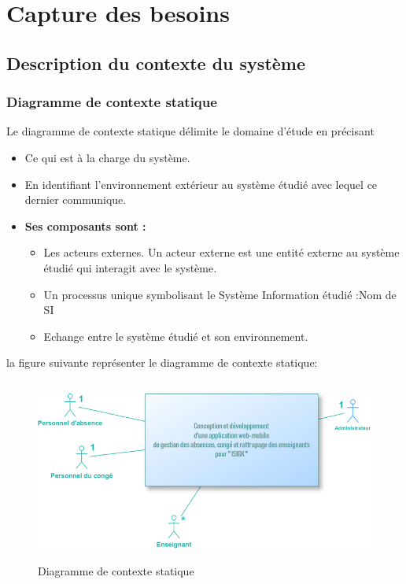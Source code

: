 \documentclass[12 pt]{report}
\begin{document}
\section{Capture des besoins}
\subsection{Description du contexte du système}
\subsubsection{Diagramme de contexte statique}


Le diagramme de contexte statique délimite le domaine d’étude en précisant 
\begin{itemize}[font=\color{black} \Large, label=]

	\item Ce qui est à la charge du système.
	\item En identifiant l’environnement extérieur au système étudié avec lequel ce dernier communique. 
\end{itemize}
\newpage
\begin{itemize}[font=\color{black} \Large, label=]
\item \textbf{Ses composants sont : }
\begin{itemize}[font=\color{black} \Large, label=]
\item Les acteurs externes. Un acteur externe est une entité externe au système étudié qui interagit avec le système. 
\item  Un processus unique symbolisant le Système Information étudié :Nom de SI
\item Echange entre le système étudié et son environnement.
\end{itemize}

\end{itemize}

la figure suivante représenter le diagramme de contexte statique:
\begin{center}
\begin{figure}[h]
\includegraphics[width= 17 cm ,height= 6cm]{c.png}
\caption{ Diagramme de contexte statique}
\end{figure}
\end{center}
\end{document}

